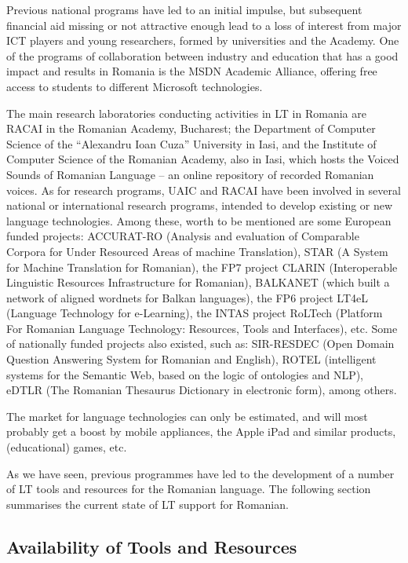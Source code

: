 \documentclass[]{../../metanetpaper}
\begin{document}
\begin{multicols}{2}
Previous national programs have led to an initial impulse, but subsequent financial aid missing or not attractive enough lead to a loss of interest from major ICT players and young researchers, formed by universities and the Academy. One of the programs of collaboration between industry and education that has a good impact and results in Romania is the MSDN Academic Alliance, offering free access to students to different Microsoft technologies. 

The main research laboratories conducting activities in LT in Romania are RACAI in the Romanian Academy, Bucharest; the Department of Computer Science of the “Alexandru Ioan Cuza” University in Iasi, and the Institute of Computer Science of the Romanian Academy, also in Iasi, which hosts the Voiced Sounds of Romanian Language – an online repository of recorded Romanian voices. As for research programs, UAIC and RACAI have been involved in several national or international research programs, intended to develop existing or new language technologies. Among these, worth to be mentioned are some European funded projects: ACCURAT-RO (Analysis and evaluation of Comparable Corpora for Under Resourced Areas of machine Translation), STAR (A System for Machine Translation for Romanian), the FP7 project CLARIN (Interoperable Linguistic Resources Infrastructure for Romanian), BALKANET (which built a network of aligned wordnets for Balkan languages), the FP6 project LT4eL (Language Technology for e-Learning), the INTAS project RoLTech (Platform For Romanian Language Technology: Resources, Tools and Interfaces), etc. Some of nationally funded projects also existed, such as: SIR-RESDEC (Open Domain Question Answering System for Romanian and English), ROTEL (intelligent systems for the Semantic Web, based on the logic of ontologies and NLP), eDTLR (The Romanian Thesaurus Dictionary in electronic form), among others.

The market for language technologies can only be estimated, and will most probably get a boost by mobile appliances, the Apple iPad and similar products, (educational) games, etc. 

As we have seen, previous programmes have led to the development of a number of LT tools and resources for the Romanian language. The following section summarises the current state of LT support for Romanian.
  
\subsection{Availability of Tools and Resources}


\end{multicols}
\end{document}
